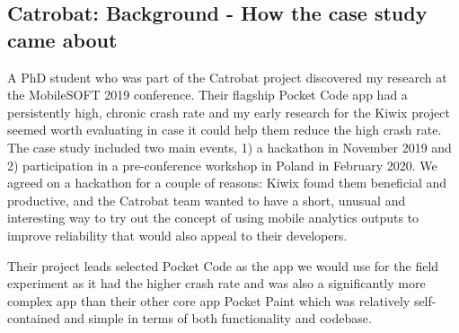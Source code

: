 
\subsection{Catrobat: Background - How the case study came about}
A PhD student who was part of the Catrobat project discovered my research at the MobileSOFT 2019 conference. Their flagship Pocket Code app had a persistently high, chronic crash rate and my early research for the Kiwix project seemed worth evaluating in case it could help them reduce the high crash rate. The case study included two main events, 1) a hackathon in November 2019 and 2) participation in a pre-conference workshop in Poland in February 2020. We agreed on a hackathon for a couple of reasons: Kiwix found them beneficial and productive, and the Catrobat team wanted to have a short, unusual and interesting way to try out the concept of using mobile analytics outputs to improve reliability that would also appeal to their developers. 

Their project leads selected Pocket Code as the app we would use for the field experiment as it had the higher crash rate and was also a significantly more complex app than their other core app Pocket Paint which was relatively self-contained and simple in terms of both functionality and codebase.


